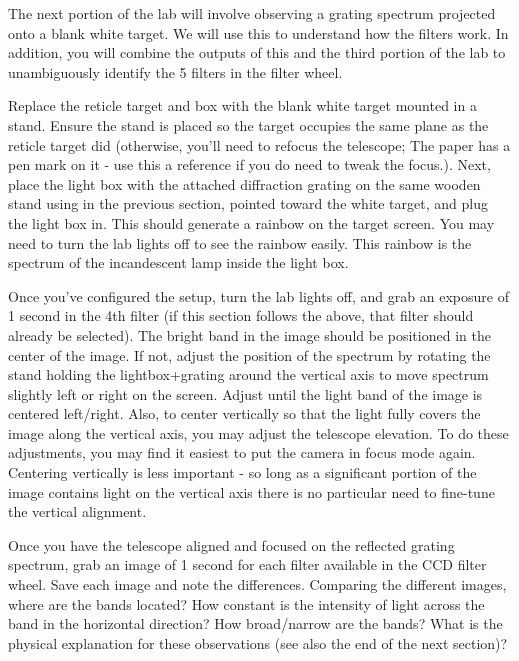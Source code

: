 The next portion of the lab will involve observing a grating spectrum projected onto a blank white
target. We will use this to understand how the filters work. In addition, you will combine the
outputs of this and the third portion of the lab to unambiguously identify the 5 filters in the filter
wheel.
\begin{steps}
	\item Replace the reticle target and box with the blank white target mounted in a stand. Ensure
	the stand is placed so the target occupies the same plane as the reticle target did (otherwise,
	you’ll need to refocus the telescope; The paper has a pen mark on it - use this a reference if you do need to tweak the focus.). Next, place the light box with the attached diffraction
	grating on the same wooden stand using in the previous section, pointed toward the white target, and plug the light box in.
	This should generate a rainbow on the target screen. You may need to turn the lab lights
	off to see the rainbow easily. This rainbow is the spectrum of the incandescent lamp inside
	the light box.
	
	\item Once you’ve configured the setup, turn the lab lights off, and grab an exposure of 1 second
	in the 4th filter (if this section follows the above, that filter should already be selected).
	The bright band in the image should be positioned in the center of the image. If not, adjust
	the position of the spectrum by rotating the stand holding the lightbox+grating around the
	vertical axis to move spectrum slightly left or right on the screen. Adjust until the light band of the image is centered left/right. Also,
	to center vertically so that the light fully covers the image along the vertical axis, you may
 adjust the telescope elevation. To do these adjustments, you may find it easiest to put the camera
	in focus mode again. Centering vertically is less important - so long as a significant portion
	of the image contains light on the vertical axis there is no particular need to fine-tune the
	vertical alignment.
	
	\item Once you have the telescope aligned and focused on the reflected grating spectrum, grab an
	image of 1 second for each filter available in the CCD filter wheel. Save each image and note
	the differences. Comparing the different images, where are the bands located? How constant is the intensity of
	light across the band in the horizontal direction? How broad/narrow are the bands? What
	is the physical explanation for these observations (see also the end of the next section)?
\end{steps}

